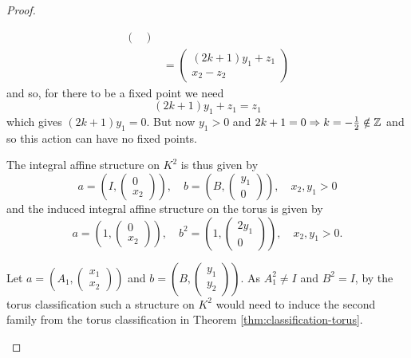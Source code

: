\begin{proof}
\begin{case}[$A=I$, $B=B_1$]
\begin{align*}
\begin{pmatrix}
                                                     \end{pmatrix} \\
                               & = \begin{pmatrix}
                                       (2k+1)y_1 + z_1 \\ x_2 - z_2
                                   \end{pmatrix}
        \end{align*}
        and so, for there to be a fixed point we need
        $$(2k+1)y_1 + z_1 = z_1$$
        which gives $(2k+1)y_1 = 0$. But now $y_1>0$ and $2k+1 = 0 \Rightarrow k = -\frac{1}{2} \notin \mathbb{Z}$ and so this action can have no fixed points.

        The integral affine structure on $K^2$ is thus given by $$a = \left(I, \begin{pmatrix}
                    0 \\ x_2
                \end{pmatrix}\right), \quad b = \left(B, \begin{pmatrix}
                    y_1 \\ 0
                \end{pmatrix}\right), \quad x_2, y_1>0$$
        and the induced integral affine structure on the torus is given by
        $$
            a = \left(1, \begin{pmatrix}
                    0 \\ x_2
                \end{pmatrix} \right), \quad b^2 = \left(1, \begin{pmatrix}
                    2y_1 \\ 0
                \end{pmatrix} \right), \quad x_2, y_1>0.
        $$
    \end{case}
    \begin{case}[$A=A_1$, $B=B_1$]
        Let $a = \left( A_1, \begin{pmatrix}
                    x_1 \\ x_2
                \end{pmatrix} \right)$ and $b = \left( B, \begin{pmatrix}
                    y_1 \\ y_2
                \end{pmatrix} \right)$.
        As $A_1^2 \neq I$ and $B^2 = I$, by the torus classification such a structure on $K^2$ would need to induce the second family from the torus classification in Theorem \ref{thm:classification-torus}.

\end{case}
\end{proof}
